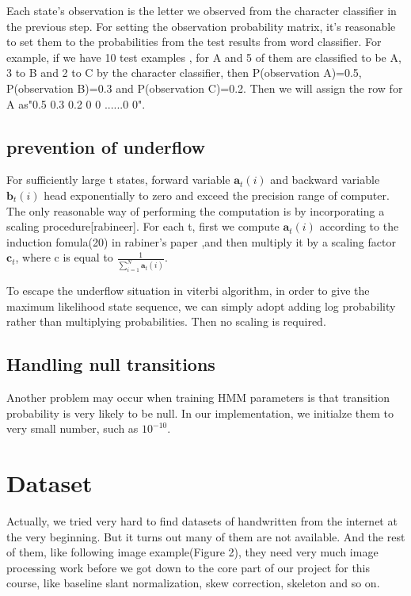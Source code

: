 \documentclass[11pt]{article}
\begin{document}
\begin{enumerate}
Each state's observation is the letter we observed from the character classifier in the previous step. For setting the observation probability matrix, it's reasonable to set them to the probabilities from the test results from word classifier. For example, if we have 10 test examples , for A and 5 of them are classified to be A, 3 to B and 2 to C by the character classifier, then P(observation A)=0.5, P(observation B)=0.3 and P(observation C)=0.2. Then we will assign the row for A as"0.5 0.3 0.2 0 0 ......0 0".

\end{enumerate}

\subsection{prevention of underflow}

For sufficiently large t states, forward variable $\textbf{a}_t(i)$ and backward variable  $\textbf{b}_t(i)$ head exponentially to zero and exceed the precision range of computer. The only reasonable way of performing the computation is by incorporating a scaling procedure[rabineer].
For each t, first we compute $\textbf{a}_t(i)$ according to the induction fomula(20) in rabiner's paper ,and then multiply it by a scaling factor  $\textbf{c}_t$, where c is equal to $ \frac{1}{ \displaystyle\sum_{i=1}^N \textbf{a}_t(i)}$.

To escape the underflow situation in viterbi algorithm, in order to give the maximum likelihood state sequence, we can simply adopt adding log probability rather than multiplying probabilities. Then no scaling is required.

\subsection{Handling null transitions}
Another problem may occur when training HMM parameters is that transition probability is very likely to be null. In our implementation, we initialze them to very small number, such as \textbf{ $10^{-10}$}.

\section{Dataset}

Actually, we tried very hard to find datasets of handwritten from the internet at the very beginning. But it turns out many of them are not available. And the rest of them, like following image example(Figure 2), they need very much image processing work before we got down to the core part of our project for this course, like baseline slant normalization, skew correction, skeleton and so on.
\end{document}
